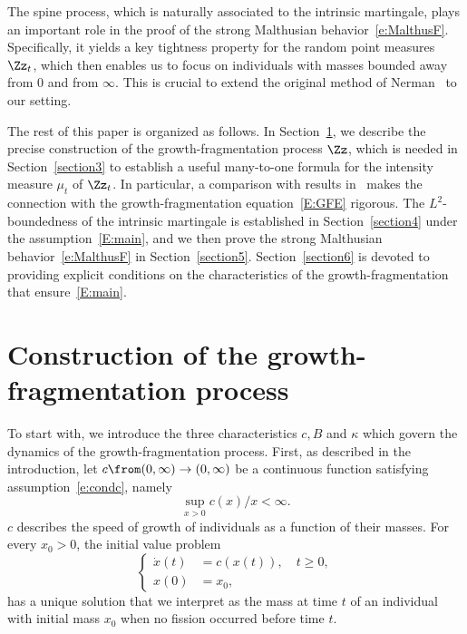 The spine process, which is naturally associated to the intrinsic martingale, plays an important role in the proof of the strong Malthusian behavior~\eqref{e:MalthusF}. Specifically, it yields a key tightness property for the random point measures $\Zz_t$, which then enables us to focus on individuals with masses bounded away from $0$ and from $\infty$. This is crucial to extend the original method of Nerman~\cite{Nerman} to our setting.

The rest of this paper is organized as follows. In Section~\ref{section2}, we describe the precise construction of the growth-fragmentation process $\Zz$, which is needed in Section~\ref{section3} to establish a useful many-to-one formula for the intensity measure $\mu_t$ of $\Zz_t$. In particular, a comparison with results in~\cite{BW} makes the connection with the growth-fragmentation equation~\eqref{E:GFE} rigorous. The $L^2$-boundedness of the intrinsic martingale is established in Section~\ref{section4} under the assumption~\eqref{E:main}, and we then prove the strong Malthusian behavior~\eqref{e:MalthusF} in Section~\ref{section5}. Section~\ref{section6} is devoted to providing explicit conditions on the characteristics of the growth-fragmentation that ensure~\eqref{E:main}.

\section{Construction of the growth-fragmentation process}\label{section2}
To start with, we introduce the three characteristics $c, {B}$ and $\kappa$ which govern the dynamics of the growth-fragmentation process. First, as described in the introduction, let $c\from (0,\infty) \to (0,\infty)$ be a continuous function satisfying assumption~\eqref{e:condc}, namely
\begin{equation*}
\sup_{x>0} c(x)/x<\infty.
\end{equation*}
$c$ describes the speed of growth of individuals as a function of their masses. For every $x_0>0$, the initial value problem
\begin{equation}\label{e:ode}
\begin{cases}
\dot{x}(t) &= c(x(t)), \quad t \geq 0, \\
x(0) &= x_0,
\end{cases}
\end{equation}
has a unique solution that we interpret as the mass at time $t$ of an individual with initial mass $x_0$ when no fission occurred before time $t$.

